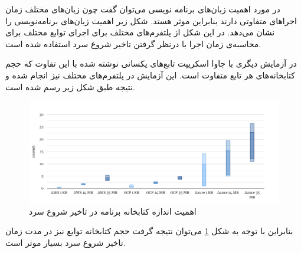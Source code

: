 در مورد اهمیت زبان‌های برنامه نویسی می‌توان گفت چون زبان‌های مختلف زمان اجراهای متفاوتی دارند بنابراین موثر هستد. شکل زیر اهمیت زبان‌های برنامه‌نویسی را نشان می‌دهد. در این شکل از پلتفرم‌های مختلف برای اجرای توابع مختلف برای محاسبه‌ی زمان اجرا با درنظر گرفتن تاخیر شروع سرد استفاده شده است. 

در آزمایش دیگری با جاوا اسکریپت تابع‌های یکسانی نوشته شده با این تفاوت که حجم کتابخانه‌های هر تابع متفاوت است. این آزمایش در پلتفرم‌های مختلف نیز انجام شده و نتیجه طبق شکل زیر رسم شده است. 

\begin{figure}
	\centering
	\includegraphics[width=\linewidth]{figs/ColdStart-programming-language-libraries}
	\caption {اهمیت اندازه کتابخانه برنامه  در تاخیر شروع سرد}
	\label{fig:ColdStart-programming-language-libraries}
\end{figure}

بنابراین با توجه به شکل \ref{fig:ColdStart-programming-language-libraries} می‌توان نتیجه گرفت حجم کتابخانه توابع نیز در مدت زمان تاخیر شروع سرد بسیار موثر است. 